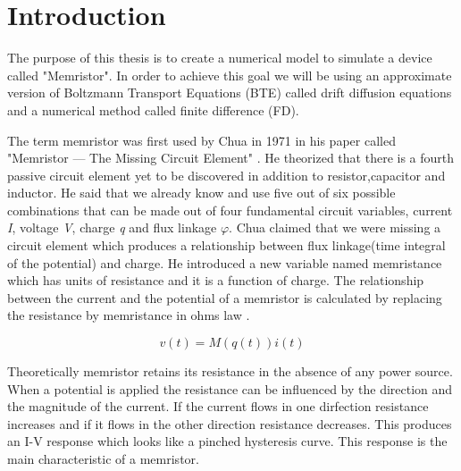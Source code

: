 
\chapter{Introduction} %

\label{Chapter1} %



The purpose of this thesis is to create a numerical model to simulate a device called "Memristor". In order to achieve this goal we will be using an approximate version of Boltzmann Transport Equations (BTE) called drift diffusion equations and a numerical method called finite difference (FD). 

The term memristor was first used by Chua in 1971 in his paper called  "Memristor — The Missing Circuit Element" \cite{chua}. He theorized that there is a fourth passive circuit element yet to be discovered in addition to resistor,capacitor and inductor. He said that we already know and use five out of six possible combinations that can be made out of four fundamental circuit variables, current \textit{I}, voltage \textit{V}, charge \textit{q} and flux linkage \textit{$\varphi$}. Chua claimed that we were missing a circuit element which produces a relationship between flux linkage(time integral of the potential) and charge. He introduced a new variable named memristance which has units of resistance and it is a function of charge. The relationship between the current and the potential of a memristor is calculated by replacing the resistance by memristance in ohms law \cite{chua} \cite{Dragica1} \cite{SG} \cite{NumModel} \cite{MisMem} \cite{SimChargeTrans} \cite{PedotBook} \cite{snowden} \cite{PedotCon}.

\begin{equation}
v(t)=M(q(t))i(t)
\end{equation}

Theoretically memristor retains its resistance in the absence of any power source. When a potential is applied the resistance can be influenced by the direction and the magnitude of the current. If the current flows in one dirfection resistance increases and if it flows in the other direction resistance decreases. This produces an I-V response which looks like a pinched hysteresis curve. This response is the main characteristic of a memristor. 

